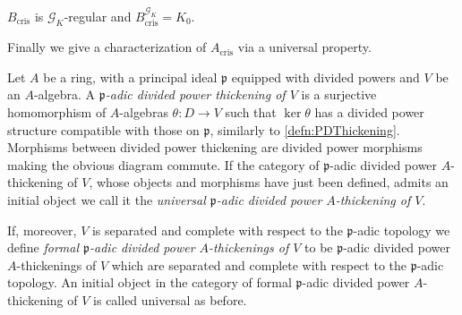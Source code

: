 \begin{prop}
	$B_{\mathrm{cris}}$ is $\mathscr{G}_K$-regular
	and $B_{\mathrm{cris}}^{\mathscr{G}_K} = K_0$.
\end{prop}


\noindent
Finally we give a characterization of $A_{\mathrm{cris}}$ via
a universal property.
\begin{defn}
	Let $A$ be a ring, with a principal ideal $\mathfrak{p}$
	equipped with divided powers and $V$ be an $A$-algebra.
	A \emph{$\mathfrak{p}$-adic divided power thickening of $V$}
	is a surjective homomorphism of $A$-algebras
	$\theta\colon D \to V$ such that $\ker \theta$ has a divided power structure
	compatible with those on $\mathfrak{p}$, similarly to \cref{defn:PDThickening}.
	Morphisms between divided power thickening are divided power morphisms
	making the obvious diagram commute.
	If the category of $\mathfrak{p}$-adic divided power $A$-thickening of $V$,
	whose objects and morphisms have just been defined, admits an initial object
	we call it the \emph{universal $\mathfrak{p}$-adic divided power $A$-thickening of $V$}.
	
	If, moreover, $V$ is separated and complete with respect to the $\mathfrak{p}$-adic topology
	we define \emph{formal $\mathfrak{p}$-adic divided power $A$-thickenings of $V$} to be
	$\mathfrak{p}$-adic divided power $A$-thickenings of $V$ which are separated and complete
	with respect to the $\mathfrak{p}$-adic topology.
	An initial object in the category of formal $\mathfrak{p}$-adic divided power $A$-thickening
	of $V$ is called universal as before.
\end{defn}


